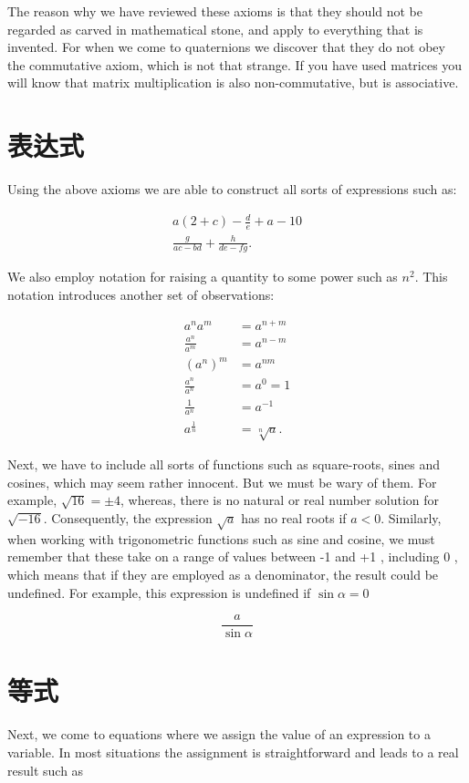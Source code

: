 The reason why we have reviewed these axioms is that they should not be regarded as carved in mathematical stone, and apply to everything that is invented. For when we come to quaternions we discover that they do not obey the commutative axiom, which is not that strange. If you have used matrices you will know that matrix multiplication is also non-commutative, but is associative.

\section{表达式}
Using the above axioms we are able to construct all sorts of expressions such as:

$$
\begin{gathered}
a(2+c)-\frac{d}{e}+a-10 \\
\frac{g}{a c-b d}+\frac{h}{d e-f g} .
\end{gathered}
$$

We also employ notation for raising a quantity to some power such as $n^{2}$. This notation introduces another set of observations:

$$
\begin{aligned}
a^{n} a^{m} & =a^{n+m} \\
\frac{a^{n}}{a^{m}} & =a^{n-m} \\
\left(a^{n}\right)^{m} & =a^{n m} \\
\frac{a^{n}}{a^{n}} & =a^{0}=1 \\
\frac{1}{a^{n}} & =a^{-1} \\
a^{\frac{1}{n}} & =\sqrt[n]{a} .
\end{aligned}
$$

Next, we have to include all sorts of functions such as square-roots, sines and cosines, which may seem rather innocent. But we must be wary of them. For example, $\sqrt{16}= \pm 4$, whereas, there is no natural or real number solution for $\sqrt{-16}$. Consequently, the expression $\sqrt{a}$ has no real roots if $a<0$. Similarly, when working with trigonometric functions such as sine and cosine, we must remember that these take on a range of values between -1 and +1 , including 0 , which means that if they are employed as a denominator, the result could be undefined. For example, this expression is undefined if $\sin \alpha=0$

$$
\frac{a}{\sin \alpha}
$$

\section{等式}
Next, we come to equations where we assign the value of an expression to a variable. In most situations the assignment is straightforward and leads to a real result such as

